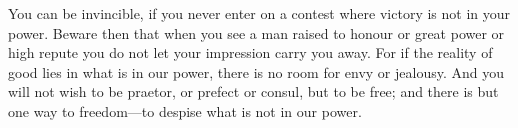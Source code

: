 You can be invincible, if you never enter  on a contest where victory is not in
your power. Beware then that when you see a man raised to honour or great power
or  high repute  you do  not let  your impression  carry you  away. For  if the
reality of  good lies in  what is in  our power, there is  no room for  envy or
jealousy. And you will not wish to be  praetor, or prefect or consul, but to be
free; and  there is  but one  way to freedom—to  despise what  is not  in our
power.
